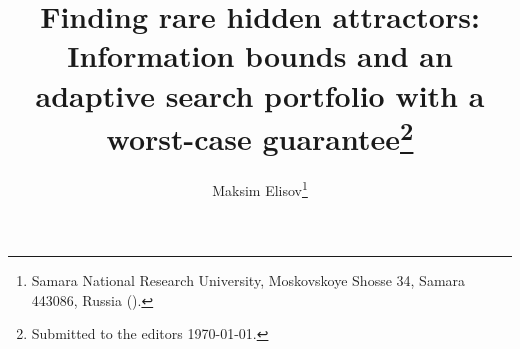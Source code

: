\usepackage{amsfonts}
\usepackage{amssymb}
\usepackage{bm}
\usepackage{graphicx}
\usepackage{booktabs}
\usepackage{array}
\usepackage{xcolor}
\usepackage{iftex}
\ifXeTeX
\else
  \ifpdf{}\fi
\fi
\graphicspath{{figures/}}

\newcommand{\creflastconjunction}{, and~}


\newcommand{\ci}[2]{{\scriptsize[#1, #2]}}


\title{Finding rare hidden attractors: Information bounds and an adaptive search portfolio with a worst-case guarantee\thanks{Submitted to the editors \today.
}}

\author{Maksim Elisov\thanks{Samara National Research University, Moskovskoye Shosse 34, Samara 443086, Russia
  ().}}
